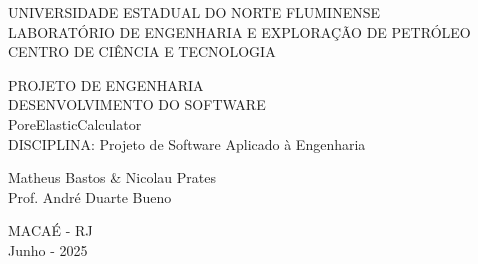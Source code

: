 \begin{center}
{\large UNIVERSIDADE ESTADUAL DO NORTE FLUMINENSE}\\
{\large LABORATÓRIO DE ENGENHARIA E EXPLORAÇÃO DE PETRÓLEO}\\
{\large CENTRO DE CIÊNCIA E TECNOLOGIA}{\large\par}
\par\end{center}

\begin{center}
{\large}{\large\par}
\par\end{center}

\vspace{3cm}

\begin{center}
{\large PROJETO DE ENGENHARIA}\\
{\large DESENVOLVIMENTO DO SOFTWARE }\\
{\large PoreElasticCalculator}\\
{\large DISCIPLINA: Projeto de Software Aplicado à Engenharia }{\large\par}
\par\end{center}

\vspace{3cm}

\begin{center}
{\large Matheus Bastos \& Nicolau Prates}\\
{\large Prof. André Duarte Bueno}{\large\par}
\par\end{center}

\vspace{5cm}
\thispagestyle{empty}
\begin{center}
{\large MACAÉ - RJ}\\
{\large Junho - 2025}{\large\par}
\par\end{center}

